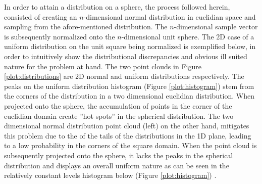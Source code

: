 In order to attain a distribution on a sphere, the process followed herein,
consisted of creating an $n$-dimensional normal distribution in euclidian space and
sampling from the afore-mentioned distribution.  The $n$-dimensional sample vector
is subsequently normalized onto the $n$-dimensional unit sphere.
The 2D case of a uniform
distribution on the unit square being normalized is exemplified below, in order to intuitively
show the distributional discrepancies and obvious ill suited nature for the problem
at hand.  The two point clouds in Figure \ref{plot:distributions} are 2D normal and uniform distributions
respectively.  The peaks on the uniform distribution histogram (Figure \ref{plot:histogram}) stem from the corners
of the distribution in a two dimensional euclidian distribution.  When projected onto
the sphere, the accumulation of points in the corner of the euclidian domain create
''hot spots'' in the spherical distribution.  The two dimensional normal
distribution point cloud (left) on the other hand, mitigates this problem due to the
of the tails of the distributions in the 1D plane, leading to a low probability
in the corners of the square domain.  When the point cloud  is subsequently projected
onto the sphere, it lacks the peaks in the  spherical distribution and displays an
overall uniform nature as can be seen in the relatively constant levels  histogram below (Figure \ref{plot:histogram})
\cite{Yang,Muller1959,marsaglia1972}.


